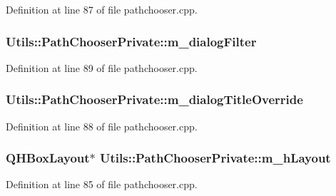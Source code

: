 Definition at line 87 of file pathchooser.\-cpp.

\hypertarget{struct_utils_1_1_path_chooser_private_aa4d089b9547a21ea1d39c8c8151b82d9}{
\subsubsection[{m\-\_\-dialog\-Filter}]{ Utils\-::\-Path\-Chooser\-Private\-::m\-\_\-dialog\-Filter}}\label{struct_utils_1_1_path_chooser_private_aa4d089b9547a21ea1d39c8c8151b82d9}


Definition at line 89 of file pathchooser.\-cpp.

\hypertarget{struct_utils_1_1_path_chooser_private_a5a95de28d99841640ca55678d9795a62}{
\subsubsection[{m\-\_\-dialog\-Title\-Override}]{ Utils\-::\-Path\-Chooser\-Private\-::m\-\_\-dialog\-Title\-Override}}\label{struct_utils_1_1_path_chooser_private_a5a95de28d99841640ca55678d9795a62}


Definition at line 88 of file pathchooser.\-cpp.

\hypertarget{struct_utils_1_1_path_chooser_private_a774f99b0dc2901501561d86a347c1966}{
\subsubsection[{m\-\_\-h\-Layout}]{\setlength{\rightskip}{0pt plus 5cm}Q\-H\-Box\-Layout$\ast$ Utils\-::\-Path\-Chooser\-Private\-::m\-\_\-h\-Layout}}\label{struct_utils_1_1_path_chooser_private_a774f99b0dc2901501561d86a347c1966}


Definition at line 85 of file pathchooser.\-cpp.

